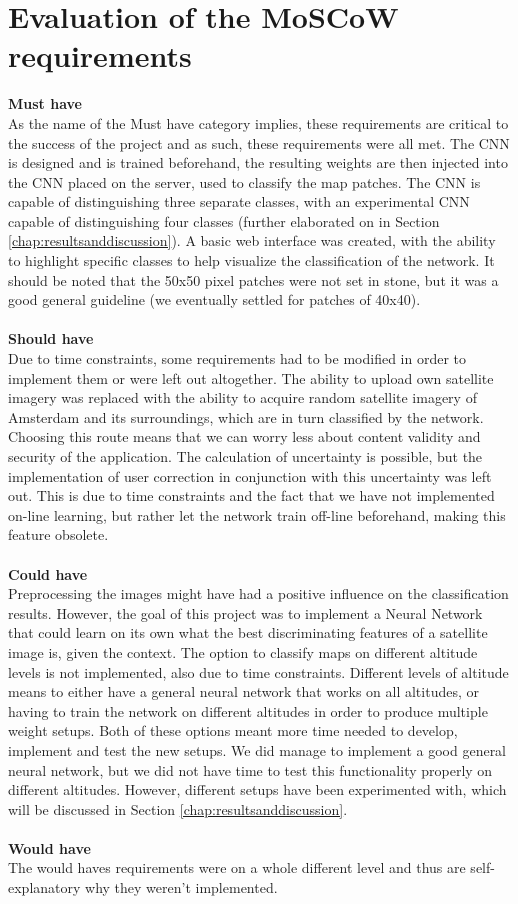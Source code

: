 \documentclass[a4paper,onecolumn]{report}
\begin{document}
\section{Evaluation of the MoSCoW requirements}
\label{sec:Evaluation MOSCOW}


\textbf{Must have}\\
As the name of the Must have category implies, these requirements are critical to the success of the project and as such, these requirements were all met. The CNN is designed and is trained beforehand, the resulting weights are then injected into the CNN placed on the server, used to classify the map patches. The CNN is capable of distinguishing three separate classes, with an experimental CNN capable of distinguishing four classes (further elaborated on in Section \ref{chap:resultsanddiscussion}).
A basic web interface was created, with the ability to highlight specific classes to help visualize the classification of the network. It should be noted that the 50x50 pixel patches were not set in stone, but it was a good general guideline (we eventually settled for patches of 40x40).\\
\\
\textbf{Should have}\\
Due to time constraints, some requirements had to be modified in order to implement them or were left out altogether. The ability to upload own satellite imagery was replaced with the ability to acquire random satellite imagery of Amsterdam and its surroundings, which are in turn classified by the network. Choosing this route means that we can worry less about content validity and security of the application. The calculation of uncertainty is possible, but the implementation of user correction in conjunction with this uncertainty was left out. This is due to time constraints and the fact that we have not implemented on-line learning, but rather let the network train off-line beforehand, making this feature obsolete.\\
\\
\textbf{Could have}\\
Preprocessing the images might have had a positive influence on the classification results. However, the goal of this project was to implement a Neural Network that could learn on its own what the best discriminating features of a satellite image is, given the context. The option to classify maps on different altitude levels is not implemented, also due to time constraints. Different levels of altitude means to either have a general neural network that works on all altitudes, or having to train the network on different altitudes in order to produce multiple weight setups. Both of these options meant more time needed to develop, implement and test the new setups. We did manage to implement a good general neural network, but we did not have time to test this functionality properly on different altitudes. However, different setups have been experimented with, which will be discussed in Section \ref{chap:resultsanddiscussion}.\\
\\
\textbf{Would have}\\
The would haves requirements were on a whole different level and thus are self-explanatory why they weren't implemented.
\end{document}
